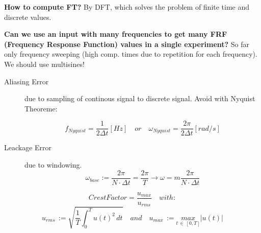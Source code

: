 \begin{tcolorbox}[colback=brown!5!white,colframe=brown!75!black,title=Fourier Transformation]
\textbf{How to compute FT?} By DFT, which solves the problem of finite time and discrete values.

\textbf{Can we use an input with many frequencies to get many FRF (Frequency Response Function) values in a single experiment?} So far only frequency sweeping (high comp. times due to repetition for each frequency). We should use multisines!
\end{tcolorbox}

\begin{tcolorbox}[colback=brown!5!white,colframe=brown!75!black,title=Aliasing and Leakage Errors]
\begin{description}
\item[Aliasing Error] due to sampling of continous signal to discrete signal. Avoid with Nyquist Theoreme:

\begin{equation*}
f_{Nyquist} = \frac{1}{2\Delta t} [Hz] \quad or \quad \omega_{Nyquist} = \frac{2 \pi }{ 2\Delta t} [rad/s]
\end{equation*}

\item[Leackage Error] due to windowing.
\begin{equation*}
\omega _{ base }:=\frac { 2\pi  }{ N\cdot \Delta t } =\frac { 2\pi  }{ T }  \rightarrow \omega = m\frac { 2\pi  }{ N\cdot \Delta t }
\end{equation*}
\end{description}
\end{tcolorbox}

\begin{tcolorbox}[colback=brown!5!white,colframe=brown!75!black,title=Crest Factor = Scheitelfaktor]
\begin{equation*}
CrestFactor=\frac { u_{ max } }{ u_{ rms } } \quad with:
\end{equation*}
\begin{equation*}
u_{ rms }\, := \sqrt{ \frac { 1 }{ T } \int _{ 0 }^{ T }{ u(t)^2 \, dt }  } \quad and \quad u_{ max }\, :=\underset { t\, \in \, [0,T] }{ max } |u(t)|
\end{equation*}
\end{tcolorbox}

